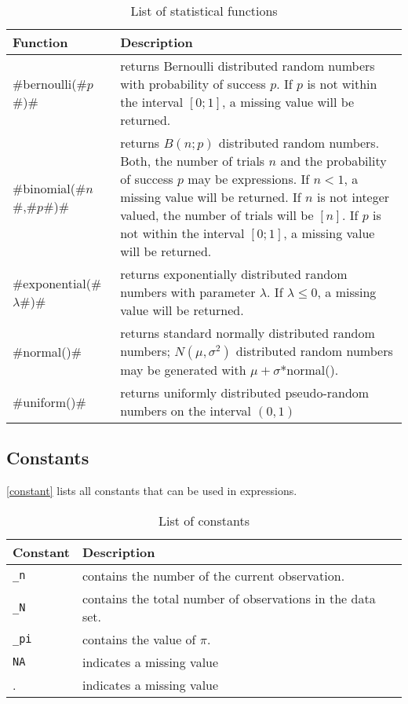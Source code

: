 \begin{table}[ht]
\begin{center}
\begin{tabular}{|l|p{11cm}|}
\hline
{\bf Function} & {\bf Description} \\
 \hline \hline
 #bernoulli(#$p$#)# & returns Bernoulli distributed random numbers with probability of success $p$. If $p$ is not
 within the interval $[0;1]$, a missing value will be returned. \\
 \hline
 #binomial(#$n$#,#$p$#)# & returns $B(n;p)$ distributed random numbers. Both, the number of trials $n$ and the probability of success $p$ may be expressions. If $n < 1$, a missing value will be returned. If $n$ is not integer valued, the number of trials will be $[n]$. If $p$ is not within the interval $[0;1]$, a  missing value will be returned. \\
 \hline
 #exponential(#$\lambda$#)# & returns exponentially distributed  random numbers with parameter $\lambda$.  If $\lambda \leq 0$, a missing value will be returned. \\
 \hline
 #normal()# & returns standard normally distributed random  numbers; $N(\mu,\sigma^2)$ distributed random numbers may be generated with $\mu + \sigma$*normal(). \\
 \hline
 #uniform()# & returns uniformly distributed pseudo-random numbers on the interval $(0,1)$ \\
 \hline
\end{tabular}
{\em \caption{\label{statfunc} List of statistical functions}}
\end{center}
\end{table}


\subsection{Constants}
 \index{$\pi$} 

\autoref{constant} lists all constants that can be used in expressions.


\begin{table}[ht]
\begin{center}
\begin{tabular}{|l|l|}
\hline
Constant & Description \\
\hline \hline
\texttt{\_n} & contains the number of the current observation.  \\
\texttt{\_N }& contains the total number of observations in the data set. \\
\texttt{\_pi} & contains the value of $\pi$. \\
\texttt{NA} & indicates a missing value \\
.  & indicates a missing value \\
\hline
\end{tabular}
{\em \caption{\label{constant} List of constants}}
\end{center}
\end{table}


